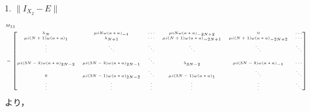 \begin{enumerate}
  \item[1. $\|I_{X_2} - E \|$]

\begin{equation}
  \tiny
  \begin{split}
    &M_{11}\\
    &=\begin{bmatrix}
      \lambda_{N} & \mu i N \omega (a*a)_{-1} & \cdots & \mu i N \omega (a*a)_{-2N+2} & 0 & \cdots \\
      \mu i (N+1) \omega (a*a)_{1} & \lambda_{N+1} & \cdots & \mu i (N+1) \omega (a*a)_{-2N+1} & \mu i (N+1) \omega (a*a)_{-2N+2} & \cdots \\
      \vdots & \ddots & \ddots & \ddots & \ddots & \ddots \\
      \mu i (3N-2) \omega (a*a)_{2N-2} & \mu i (3N-2) \omega (a*a)_{2N-1} & \ddots & \lambda_{3N-2} & \mu i (3N-2) \omega (a*a)_{-1} & \cdots \\
      0 & \mu i (3N-1) \omega (a*a)_{2N-2} & \ddots & \mu i (3N-1) \omega (a*a)_{1} & \ddots & \ddots \\
      \vdots & \vdots & \vdots & \vdots & \vdots & \ddots \\
    \end{bmatrix}
  \end{split}
\end{equation}
より，


\end{enumerate}
